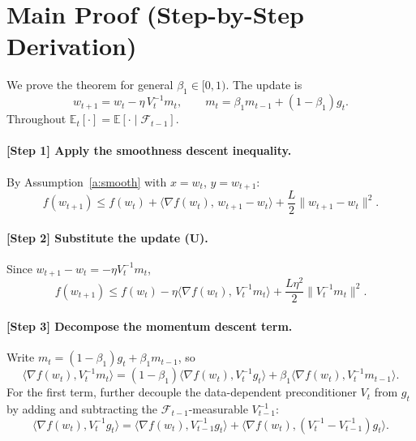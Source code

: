 \documentclass[11pt]{article}
\begin{document}
\section*{Main Proof (Step-by-Step Derivation)}


We prove the theorem for general $\beta_1\in[0,1)$. The update is
\[
w_{t+1} = w_t - \eta\,V_t^{-1} m_t,\qquad
m_t = \beta_1 m_{t-1} + (1-\beta_1)g_t. \tag{U}
\]
Throughout $\mathbb{E}_t[\cdot]=\mathbb{E}[\cdot\mid\mathcal{F}_{t-1}]$.

\paragraph{[Step 1] Apply the smoothness descent inequality.}
By Assumption~\ref{a:smooth} with $x=w_t$, $y=w_{t+1}$:
\[
f(w_{t+1}) \le f(w_t) + \langle \nabla f(w_t),\, w_{t+1}-w_t\rangle
            + \frac{L}{2}\|w_{t+1}-w_t\|^2 .
\]

\paragraph{[Step 2] Substitute the update (U).}
Since $w_{t+1}-w_t = -\eta V_t^{-1} m_t$,
\[
f(w_{t+1}) \le f(w_t) - \eta\langle \nabla f(w_t),\, V_t^{-1} m_t\rangle
            + \frac{L\eta^2}{2}\|V_t^{-1} m_t\|^2 .
\]

\paragraph{[Step 3] Decompose the momentum descent term.}
Write $m_t = (1-\beta_1)g_t + \beta_1 m_{t-1}$, so
\[
\langle \nabla f(w_t), V_t^{-1} m_t\rangle
= (1-\beta_1)\langle \nabla f(w_t), V_t^{-1} g_t\rangle
+ \beta_1 \langle \nabla f(w_t), V_t^{-1} m_{t-1}\rangle .
\]
For the first term, further decouple the data-dependent preconditioner $V_t$
from $g_t$ by adding and subtracting the $\mathcal{F}_{t-1}$-measurable
$V_{t-1}^{-1}$:
\[
\langle \nabla f(w_t), V_t^{-1} g_t\rangle
= \langle \nabla f(w_t), V_{t-1}^{-1} g_t\rangle
+ \langle \nabla f(w_t), (V_t^{-1}-V_{t-1}^{-1}) g_t\rangle .
\]
\end{document}
